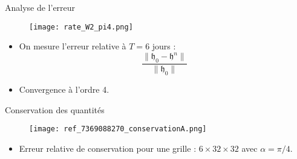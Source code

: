 \documentclass[11pt]{beamer}
\begin{document}

\begin{frame}{Analyse de l'erreur}
\begin{figure}
\texttt{[image: rate\_W2\_pi4.png]}
\end{figure}
\begin{itemize}
\item  On mesure l'erreur relative à $T=6$ jours  :
$$
\dfrac{\| \mathfrak{h}_0 - \mathfrak{h}^n \|}{\| \mathfrak{h}_0 \|}
$$
\item Convergence à l'ordre 4.
\end{itemize}
\end{frame}


\begin{frame}{Conservation des quantités}
\begin{figure}
\texttt{[image: ref\_7369088270\_conservationA.png]}
\end{figure}
\begin{itemize}
\item Erreur relative de conservation pour une grille : $6 \times 32 \times 32$ avec $\alpha=\pi/4$.
\end{itemize}
\end{frame}





























\end{document}

